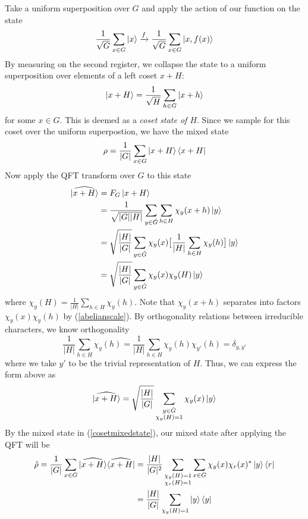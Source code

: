 Take a uniform superposition over $G$ and apply the action of our function on the state
%
\begin{equation}
  \frac{1}{\sqrt{G}}\sum_{x \in G} \ket{x} \xrightarrow{f} \frac{1}{\sqrt{G}}\sum_{x \in G} \ket{x, f(x)}
\end{equation}
By measuring on the second register, we collapse the state to a uniform superposition over elements of a left coset $x + H$:
%
\begin{equation}
  \ket{x + H} = \frac{1}{\sqrt{H}} \sum_{h \in G} \ket{x + h}
\end{equation}
%
for some $x \in G$. This is deemed as a \textit{coset state of $H$}. Since we sample for this coset over the uniform superpostion, we have the mixed state
%
\begin{equation}
  \label{cosetmixedstate}
  \rho = \frac{1}{|G|} \sum_{x \in G} \ket{x + H}\bra{x + H}
\end{equation}
%
Now apply the QFT transform over $G$ to this state
\begin{equation}
  \begin{split}
    \widehat{\ket{x + H}}
    & = F_G\ket{x + H} \\
    & = \frac{1}{\sqrt{|G||H|}} \sum_{y \in \hat{G}} \sum_{h \in H} \chi_y(x + h) \ket{y} \\
    & = \sqrt{\frac{|H|}{|G|}}\sum_{y \in \hat{G}}\chi_y(x)\big[ \frac{1}{|H|} \sum_{h \in H} \chi_y(h)\big]\ket{y} \\
    & = \sqrt{\frac{|H|}{|G|}}\sum_{y \in \hat{G}}\chi_y(x)\chi_y(H)\ket{y}
  \end{split}
\end{equation}
where
$\chi_y(H) = \frac{1}{|H|} \sum_{h \in H} \chi_y(h)$.
%
Note that $\chi_y(x+h)$ separates into factors $\chi_y(x)\chi_y(h)$ by (\ref{abelianscale}).
%
By orthogonality relations between irreducible characters, we know orthogonality
$$ \frac{1}{|H|}\sum_{h \in H} \chi_y(h) = \frac{1}{|H|}\sum_{h \in H} \chi_y(h) \chi_{y'}(h) = \delta_{y,y'}$$
where we take $y'$ to be the trivial representation of $H$. Thus, we can express the form above as
%
\begin{equation}
  \widehat{\ket{x + H}} = \sqrt{\frac{|H|}{|G|}} \sum_{\substack{y \in \hat{G} \\ \chi_y(H) = 1}}
  \chi_y(x) \ket{y}
\end{equation}
%
By the mixed state in (\ref{cosetmixedstate}), our mixed state after applying the QFT will be
%
\begin{equation} \label{AHSPDiag}
  \begin{split}
      \hat{\rho} = \frac{1}{|G|}\sum_{x \in G} \widehat{\ket{x + H}} \widehat{\bra{x + H}} & = \frac{|H|}{|G|^2}  \sum_{\substack{\chi_y(H) = 1 \\ \chi_{r}(H) = 1}} \sum_{x \in G} \chi_y(x)\chi_r(x)^* \ket{y}\bra{r} \\
      & = \frac{|H|}{|G|} \sum_{\chi_y(H) = 1} \ket{y}\bra{y}
  \end{split}
\end{equation}
